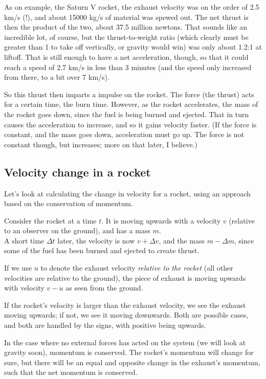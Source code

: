 As on example, the Saturn V rocket, the exhaust velocity was on the order of 2.5 km/s (!), and about 15000 kg/s of material was spewed out. The net thrust is then the product of the two, about 37.5 million newtons. That sounds like an incredible lot, of course, but the thrust-to-weight ratio (which clearly must be greater than 1 to take off vertically, or gravity would win) was only about 1.2:1 at liftoff. That is still enough to have a net acceleration, though, so that it could reach a speed of 2.7 km/s in less than 3 minutes (and the speed only increased from there, to a bit over 7 km/s).

So this thrust then imparts a impulse on the rocket. The force (the thrust) acts for a certain time, the burn time. However, as the rocket accelerates, the mass of the rocket goes down, since the fuel is being burned and ejected. That in turn causes the acceleration to increase, and so it gains velocity faster. (If the force is constant, and the mass goes down, acceleration must go up. The force is not constant though, but increases; more on that later, I believe.)

\subsection{Velocity change in a rocket}

Let's look at calculating the change in velocity for a rocket, using an approach based on the conservation of momentum.

Consider the rocket at a time $t$. It is moving upwards with a velocity $v$ (relative to an observer on the ground), and has a mass $m$.\\
A short time $\Delta t$ later, the velocity is now $v + \Delta v$, and the mass $m - \Delta m$, since some of the fuel has been burned and ejected to create thrust.

If we use $u$ to denote the exhaust velocity \emph{relative to the rocket} (all other velocities are relative to the ground), the piece of exhaust is moving upwards with velocity $v - u$ as seen from the ground.

If the rocket's velocity is larger than the exhaust velocity, we see the exhaust moving upwards; if not, we see it moving downwards. Both are possible cases, and both are handled by the signs, with positive being upwards.

In the case where no external forces has acted on the system (we will look at gravity soon), momentum is conserved. The rocket's momentum will change for sure, but there will be an equal and opposite change in the exhaust's momentum, such that the net momentum is conserved.

